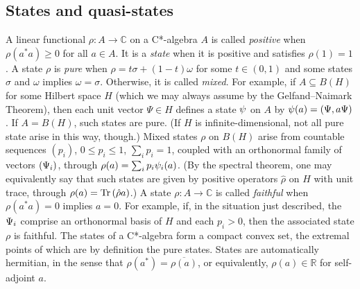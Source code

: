 \documentclass[11pt]{article}
\newcommand{\Tr}{\mbox{\rm Tr}\,} \newcommand{\Ad}{{\rm Ad}}
\newcommand{\rh}{\rho} \newcommand{\sg}{\sigma}
\newcommand{\om}{\omega} \newcommand{\Om}{\Omega}
\newcommand{\alg}[1]{\ensuremath{#1}}
\newcommand{\field}[1]{\ensuremath{\mathbb{#1}}}
\begin{document}
\subsection{States and quasi-states}\label{subsec:qs}
A linear functional $\rho:A \to
\field{C}$ on a C*-algebra $A$ is called \emph{positive} when
$\rho(a^*a) \geq 0$ for all $a \in \alg{A}$. It is a {\it state} when
it is positive and satisfies $\rho(1)=1$. A state $\rh$ is \emph{pure} when
$\rh=t \sg + (1-t)\om$ for some $t\in (0,1)$ and some states $\sg$ and $\om$
implies
$\om=\sg$. Otherwise, it is called \emph{mixed}.
For example, if $A\subseteq B(H)$ for some Hilbert space $H$ (which we may
always assume by the Gelfand--Naimark Theorem), then each unit vector $\Psi\in
H$ defines a state $\psi$ on $A$
by $\psi(a)=(\Psi, a\Psi)$. If $A=B(H)$, such states are pure. (If $H$ is
infinite-dimensional, not all pure state arise in this way, though.) Mixed
states $\rh$ on $B(H)$
arise from countable sequences $(p_i)$, $0\leqslant p_i\leqslant 1$, $\sum_i p_i=1$,
coupled with
an orthonormal family of vectors $(\Psi_i)$, through $\rh(a)=\sum_i p_i
\ps_i(a)$.
(By the spectral theorem, one may equivalently say that such states
are given by positive operators $\hat{\rh}$ on $H$ with unit trace,
through $\rh(a)=\Tr (\hat{\rh} a)$.)
  A state $\rho:\alg{A}\to\field{C}$ is called
\emph{faithful} when $\rho(a^*a)=0$ implies $a=0$. For example, if, in the
situation just described, the $\Psi_i$ comprise an orthonormal basis of $H$ and
each  $p_i>0$, then
the associated state $\rh$ is faithful.
The states of a
C*-algebra form a compact convex set, the extremal points of which are by
definition the
pure states. States are automatically
hermitian, in the sense that $\rho(a^*) = \overline{\rho(a)}$, or
equivalently, $\rho(a) \in \field{R}$ for self-adjoint
$a$.
\end{document}

